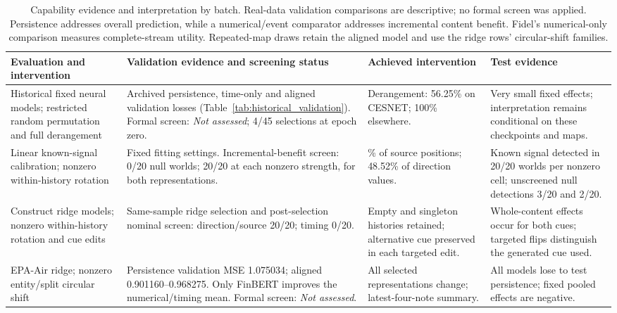 \begin{table}[!ht]
\centering\footnotesize
\setlength{\tabcolsep}{4pt}
\caption{Capability evidence and interpretation by batch. Real-data validation comparisons are descriptive; no formal screen was applied. Persistence addresses overall prediction, while a numerical/event comparator addresses incremental content benefit. Fidel's numerical-only comparison measures complete-stream utility. Repeated-map draws retain the aligned model and use the ridge rows' circular-shift families.}
\label{tab:capability_overview}
\begin{tabular}{@{}>{\raggedright\arraybackslash}p{}>{\raggedright\arraybackslash}p{}>{\raggedright\arraybackslash}p{}>{\raggedright\arraybackslash}p{}@{}}
\toprule
Evaluation and intervention & Validation evidence and screening status & Achieved intervention & Test evidence\\
\midrule
Historical fixed neural models; restricted random permutation and full derangement & Archived persistence, time-only and aligned validation losses (Table~\ref{tab:historical_validation}). Formal screen: \emph{Not assessed}; 4/45 selections at epoch zero. & Derangement: 56.25\% on CESNET; 100\% elsewhere. & Very small fixed effects; interpretation remains conditional on these checkpoints and maps.\\
Linear known-signal calibration; nonzero within-history rotation & Fixed fitting settings. Incremental-benefit screen: 0/20 null worlds; 20/20 at each nonzero strength, for both representations. & 97.27\% of source positions; 48.52\% of direction values. & Known signal detected in 20/20 worlds per nonzero cell; unscreened null detections 3/20 and 2/20.\\
Construct ridge models; nonzero within-history rotation and cue edits & Same-sample ridge selection and post-selection nominal screen: direction/source 20/20; timing 0/20. & Empty and singleton histories retained; alternative cue preserved in each targeted edit. & Whole-content effects occur for both cues; targeted flips distinguish the generated cue used.\\
EPA-Air ridge; nonzero entity/split circular shift & Persistence validation MSE 1.075034; aligned 0.901160--0.968275. Only FinBERT improves the numerical/timing mean. Formal screen: \emph{Not assessed}. & All selected representations change; latest-four-note summary. & All models lose to test persistence; fixed pooled effects are negative.\\

\end{tabular}
\end{table}

